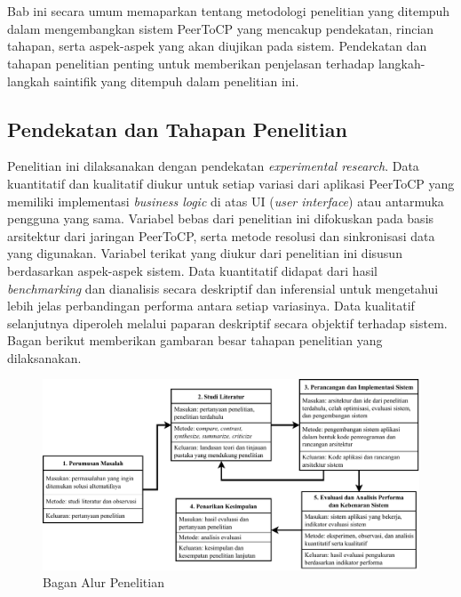 \chapter{\babTiga}
\label{bab:3}

Bab ini secara umum memaparkan tentang metodologi penelitian yang ditempuh dalam mengembangkan sistem PeerToCP yang mencakup pendekatan, rincian tahapan, serta aspek-aspek yang akan diujikan pada sistem. Pendekatan dan tahapan penelitian penting untuk memberikan penjelasan terhadap langkah-langkah saintifik yang ditempuh dalam penelitian ini.

\section{Pendekatan dan Tahapan Penelitian}
\label{sec:pendekatan}
Penelitian ini dilaksanakan dengan pendekatan \textit{experimental research}. Data kuantitatif dan kualitatif diukur untuk setiap variasi dari aplikasi PeerToCP yang memiliki implementasi \textit{business logic} di atas UI (\textit{user interface}) atau antarmuka pengguna yang sama. Variabel bebas dari penelitian ini difokuskan pada basis arsitektur dari jaringan PeerToCP, serta metode resolusi dan sinkronisasi data yang digunakan. Variabel terikat yang diukur dari penelitian ini disusun berdasarkan aspek-aspek sistem. Data kuantitatif didapat dari hasil \textit{benchmarking} dan dianalisis secara deskriptif dan inferensial untuk mengetahui lebih jelas perbandingan performa antara setiap variasinya. Data kualitatif selanjutnya diperoleh melalui paparan deskriptif secara objektif terhadap sistem. Bagan berikut memberikan gambaran besar tahapan penelitian yang dilaksanakan.

\begin{figure}
    \centering
    \includegraphics[scale=0.69]{assets/skripsi/Metode_Penelitian}
    \caption{Bagan Alur Penelitian}
    \label{bagan}
\end{figure}

